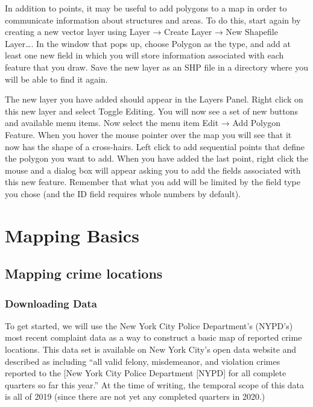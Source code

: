 \documentclass[]{book}
\begin{document}
In addition to points, it may be useful to add polygons to a map in order to communicate information about structures and areas. To do this, start again by creating a new vector layer using Layer → Create Layer → New Shapefile Layer\ldots{}. In the window that pops up, choose Polygon as the type, and add at least one new field in which you will store information associated with each feature that you draw. Save the new layer as an SHP file in a directory where you will be able to find it again.

The new layer you have added should appear in the Layers Panel. Right click on this new layer and select Toggle Editing. You will now see a set of new buttons and available menu items. Now select the menu item Edit → Add Polygon Feature. When you hover the mouse pointer over the map you will see that it now has the shape of a cross-hairs. Left click to add sequential points that define the polygon you want to add. When you have added the last point, right click the mouse and a dialog box will appear asking you to add the fields associated with this new feature. Remember that what you add will be limited by the field type you chose (and the ID field requires whole numbers by default).

\hypertarget{mapping-basics}{%
\chapter{Mapping Basics}\label{mapping-basics}}

\hypertarget{mapping-crime-locations}{%
\section{Mapping crime locations}\label{mapping-crime-locations}}

\hypertarget{downloading-data}{%
\subsection{Downloading Data}\label{downloading-data}}

To get started, we will use the New York City Police Department's (NYPD's) most recent complaint data as a way to construct a basic map of reported crime locations. This data set is available on New York City's open data website and described as including ``all valid felony, misdemeanor, and violation crimes reported to the {[}New York City Police Department {[}NYPD{]} for all complete quarters so far this year.'' At the time of writing, the temporal scope of this data is all of 2019 (since there are not yet any completed quarters in 2020.)
\end{document}
